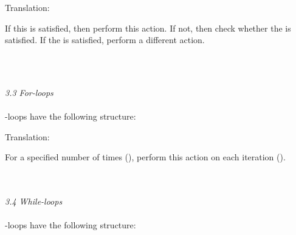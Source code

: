 
\begin{minipage}[t]{0.2\textwidth}
Translation:
\end{minipage}
\begin{minipage}[t]{0.8\textwidth}
If this  is satisfied, then perform this action. If not, then check whether the  is satisfied. If the  is	satisfied, perform a different action. 
\end{minipage} \\
\\
\clearpage %

\textit{3.3 For-loops} \\
\\
-loops have the following structure: \\


\begin{minipage}[t]{0.2\textwidth}
Translation:
\end{minipage}
\begin{minipage}[t]{0.8\textwidth}
For a specified number of times (), perform this action on each iteration ().
\end{minipage} \\
\\

\textit{3.4 While-loops} \\
\\
-loops have the following structure: \\


